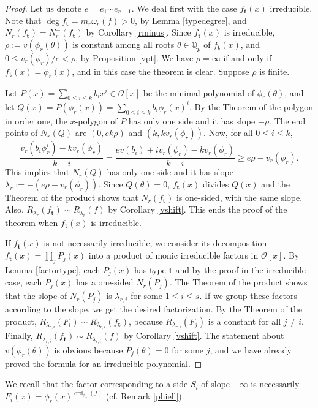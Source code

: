 \documentclass{amsart}
\def\op{\operatorname}
\def\dg{\op{deg}}
\def\la{\lambda}
\def\om{\omega}
\def\oo{{\mathcal O}}
\def\ord{\op{ord}}
\def\qpb{\overline{\mathbb{Q}}_p}
\def\t{\theta}
\def\ty{\mathbf{t}}
\def\zpx{\oo[x]}
\begin{document}
\begin{proof}Let us denote $e=e_1\cdots e_{r-1}$.
We deal first with the case $f_\ty(x)$ irreducible. Note that $\dg f_{\ty}=m_r\om_r(f)>0$, by Lemma \ref{typedegree}, and $N_r(f_\ty)=N_r^-(f_\ty)$ by Corollary \ref{rminus}. Since $f_\ty(x)$ is irreducible, $\rho:=v(\phi_r(\t))$ is constant among all roots $\t\in\qpb$ of $f_\ty(x)$, and $0\le v_r(\phi_r)/e<\rho$, by Proposition \ref{vpt}. We have $\rho=\infty$ if and only if $f_\ty(x)=\phi_r(x)$, and in this case the theorem is clear. Suppose $\rho$ is finite.

Let $P(x)=\sum_{0\le i\le k}b_ix^ i\in\zpx$ be the minimal polynomial of $\phi_r(\t)$, and let $Q(x)=P(\phi_r(x))=\sum_{0\le i\le k}b_i\phi_r(x)^i$. By the Theorem of the polygon in order one, the $x$-polygon of $P$ has only one side and it has slope $-\rho$. 
The end points of $N_r(Q)$ are $(0,ek\rho)$ and $(k,kv_r(\phi_r))$. Now, for all $0\le i\le k$,
$$
\dfrac{v_r(b_i\phi_r^i)-kv_r(\phi_r)}{k-i}=\dfrac{ev(b_i)+iv_r(\phi_r)-kv_r(\phi_r)}{k-i}\ge  
e\rho-v_r(\phi_r).$$
This implies that $N_r(Q)$ has only one side and it has slope $\la_r:=-(e\rho-v_r(\phi_r))$. Since $Q(\t)=0$, $f_\ty(x)$ divides $Q(x)$ and the Theorem of the product shows that $N_r(f_\ty)$ is one-sided, with the same slope. Also, $R_{\la_r}(f_\ty)\sim R_{\la_r}(f)$ by Corollary \ref{vshift}. This ends the proof of the theorem when $f_\ty(x)$ is irreducible.

If $f_\ty(x)$ is not necessarily irreducible, we consider its decomposition $f_{\ty}(x)=\prod_jP_j(x)$ into a product of monic irreducible factors in $\zpx$. By Lemma \ref{factortype}, each $P_j(x)$ has type $\ty$ and by  the proof in the irreducible case, each $P_j(x)$ has a one-sided $N_r(P_j)$. The Theorem of the product shows that the slope of $N_r(P_j)$ is $\la_{r,i}$ for some $1\le i\le s$. If we group these factors according to the slope, we get the desired factorization. By the Theorem of the product, $R_{\la_{r,i}}(F_i)\sim R_{\la_{r,i}}(f_\ty)$, because $R_{\la_{r,i}}(F_j)$ is a constant for all $j\ne i$. Finally, $R_{\la_{r,i}}(f_\ty)\sim R_{\la_{r,i}}(f)$ by Corollary \ref{vshift}.
The statement about $v(\phi_r(\t))$ is obvious because $P_j(\t)=0$ for some $j$, and we have already proved the formula for an irreducible polynomial.
\end{proof}

We recall that the factor corresponding to a side $S_i$ of slope $-\infty$ is necessarily $F_i(x)=\phi_r(x)^{\ord_{\phi_r}(f)}$ (cf. Remark \ref{phiell}). 
\end{document}
